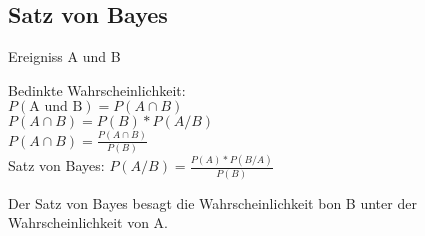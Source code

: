 \subsection{Satz von Bayes}

Ereigniss A und B

\hfill \break
{}


\hfill \break
Bedinkte Wahrscheinlichkeit:\\
$P(\textrm{A und B}) = P(A \cap B)$\\
$P(A \cap B) = P(B)*P(A/B)$\\
$P(A \cap B) = \frac{P(A \cap B)}{P(B)}$\\

\hfill \break
Satz von Bayes: $P(A/B) = \frac{P(A)*P(B/A)}{P(B)}$


\hfill \break
Der Satz von Bayes besagt die Wahrscheinlichkeit bon B unter der Wahrscheinlichkeit von A.